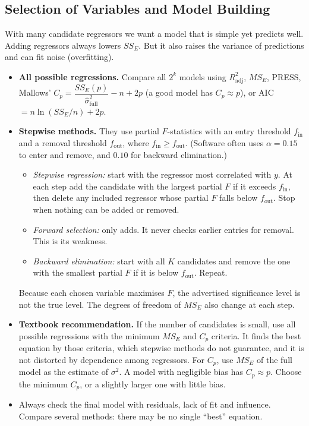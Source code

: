 \subsection{Selection of Variables and Model Building}

With many candidate regressors we want a model that is simple yet predicts well. Adding regressors always lowers $SS_E$. But it also raises the variance of predictions and can fit noise (overfitting).

\begin{itemize}
  \item \textbf{All possible regressions.} Compare all $2^k$ models using $R^2_{\mathrm{adj}}$, $MS_E$, PRESS, Mallows' $C_p=\dfrac{SS_E(p)}{\hat\sigma^2_{\mathrm{full}}}-n+2p$ (a good model has $C_p\approx p$), or AIC$=n\ln(SS_E/n)+2p$.
  \item \textbf{Stepwise methods.} They use partial $F$-statistics with an entry threshold $f_{\mathrm{in}}$ and a removal threshold $f_{\mathrm{out}}$, where $f_{\mathrm{in}}\ge f_{\mathrm{out}}$. (Software often uses $\alpha=0.15$ to enter and remove, and $0.10$ for backward elimination.)
  \begin{itemize}
    \item \emph{Stepwise regression:} start with the regressor most correlated with $y$. At each step add the candidate with the largest partial $F$ if it exceeds $f_{\mathrm{in}}$, then delete any included regressor whose partial $F$ falls below $f_{\mathrm{out}}$. Stop when nothing can be added or removed.
    \item \emph{Forward selection:} only adds. It never checks earlier entries for removal. This is its weakness.
    \item \emph{Backward elimination:} start with all $K$ candidates and remove the one with the smallest partial $F$ if it is below $f_{\mathrm{out}}$. Repeat.
  \end{itemize}
  Because each chosen variable maximises $F$, the advertised significance level is not the true level. The degrees of freedom of $MS_E$ also change at each step.
  \item \textbf{Textbook recommendation.} If the number of candidates is small, use all possible regressions with the minimum $MS_E$ and $C_p$ criteria. It finds the best equation by those criteria, which stepwise methods do not guarantee, and it is not distorted by dependence among regressors. For $C_p$, use $MS_E$ of the full model as the estimate of $\sigma^2$. A model with negligible bias has $C_p\approx p$. Choose the minimum $C_p$, or a slightly larger one with little bias.
  \item Always check the final model with residuals, lack of fit and influence. Compare several methods: there may be no single ``best'' equation.
\end{itemize}


